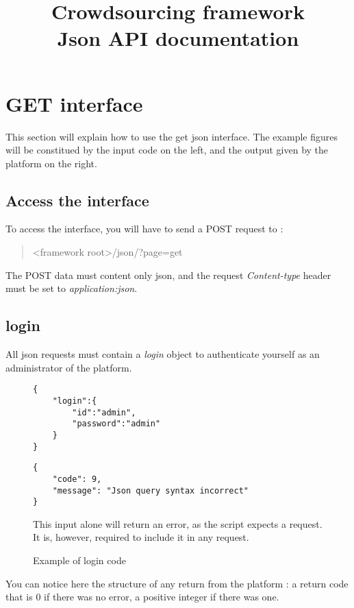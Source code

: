 \documentclass[notitlepage]{report}
\title{Crowdsourcing framework \\
Json API documentation}
\makeatletter
\newcommand*{\toccontents}{\@starttoc{toc}}
\makeatother
\begin{document}
\maketitle
\toccontents

\newpage

\chapter{GET interface}
This section will explain how to use the get json interface.
The example figures will be constitued by the input code on the left, and the output given by the platform on the right.

\section{Access the interface}
To access the interface, you will have to send a POST request to : 
\begin{quote}<framework root>/json/?page=get\end{quote}
The POST data must content only json, and the request \emph{Content-type} header must be set to \emph{application:json}.

\section{login}
All json requests must contain a \emph{login} object to authenticate yourself as an administrator of the platform.

\begin{figure}[h]
\centering
\begin{minipage}{.45\linewidth}
\begin{verbatim}
{
	"login":{	
		"id":"admin",
		"password":"admin"
	}
}
\end{verbatim}
\end{minipage}
\begin{minipage}{.45\linewidth}
\begin{verbatim}
{
	"code": 9,
	"message": "Json query syntax incorrect"
}
\end{verbatim}
This input alone will return an error, as the script expects a request. It is, however, required to include it in any request.
\end{minipage}
\caption{Example of login code}
\end{figure}
You can notice here the structure of any return from the platform : a return code that is 0 if there was no error, a positive integer if there was one.
\end{document}
